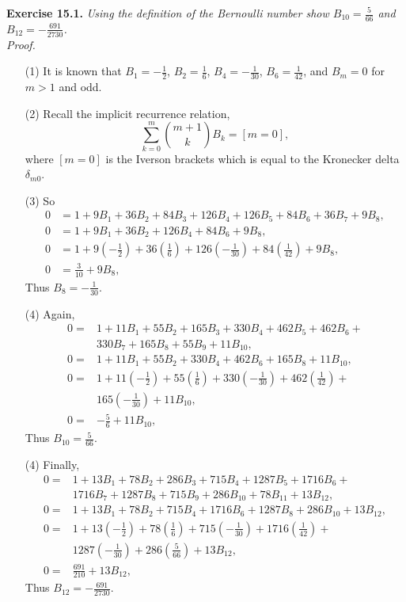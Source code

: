 \documentclass{article}
\begin{document}
\textbf{Exercise 15.1.}
\emph{Using the definition of the Bernoulli number show
$B_{10} = \frac{5}{66}$ and $B_{12} = -\frac{691}{2730}$.} \\

\emph{Proof.}
\begin{enumerate}
\item[(1)]
It is known that
$B_1 = -\frac{1}{2}$,
$B_2 = \frac{1}{6}$,
$B_4 = -\frac{1}{30}$,
$B_6 = \frac{1}{42}$,
and $B_m = 0$ for $m > 1$ and odd.
\item[(2)]
Recall the implicit recurrence relation,
$$\sum_{k = 0}^{m} {m+1 \choose k} B_k = [m = 0],$$
where $[m = 0]$ is the Iverson brackets which is equal to
the Kronecker delta $\delta_{m0}$.
\item[(3)]
So
\begin{align*}
0 &= 1 + 9 B_1 + 36 B_2 + 84 B_3 + 126 B_4 + 126 B_5 + 84 B_6 + 36 B_7 + 9 B_8, \\
0 &= 1 + 9 B_1 + 36 B_2 + 126 B_4 + 84 B_6 + 9 B_8, \\
0 &= 1 + 9 \left( -\frac{1}{2} \right)
+ 36 \left( \frac{1}{6} \right)
+ 126 \left( -\frac{1}{30} \right)
+ 84 \left( \frac{1}{42} \right)
+ 9 B_8, \\
0 &= \frac{3}{10} + 9B_8,
\end{align*}
Thus $B_8 = -\frac{1}{30}$. \\
\item[(4)]
Again,
\begin{align*}
0 =& 1 + 11 B_1 + 55 B_2 + 165 B_3 + 330 B_4 + 462 B_5 + 462 B_6 + \\
   & 330 B_7 + 165 B_8 + 55 B_9 + 11 B_{10}, \\
0 =& 1 + 11 B_1 + 55 B_2 + 330 B_4 + 462 B_6 + 165 B_8 + 11 B_{10}, \\
0 =& 1 + 11 \left( -\frac{1}{2} \right) +
     55 \left( \frac{1}{6} \right) +
     330 \left( -\frac{1}{30} \right) +
     462 \left( \frac{1}{42} \right) + \\
   & 165 \left( -\frac{1}{30} \right) +
     11 B_{10}, \\
0 =& -\frac{5}{6} + 11 B_{10},
\end{align*}
Thus $B_{10} = \frac{5}{66}$. \\
\item[(4)]
Finally,
\begin{align*}
0 =& 1 + 13 B_1 + 78 B_2 + 286 B_3 + 715 B_4 + 1287 B_5 + 1716 B_6 + \\
   & 1716 B_7 + 1287 B_8 + 715 B_9 + 286 B_{10} + 78 B_{11} + 13 B_{12}, \\
0 =& 1 + 13 B_1 + 78 B_2 + 715 B_4 + 1716 B_6 + 1287 B_8 + 286 B_{10} + 13 B_{12}, \\
0 =& 1 + 13 \left( -\frac{1}{2} \right) +
     78 \left( \frac{1}{6} \right) +
     715 \left( -\frac{1}{30} \right) +
     1716 \left( \frac{1}{42} \right) + \\
   & 1287 \left( -\frac{1}{30} \right) +
     286 \left( \frac{5}{66} \right) +
     13 B_{12}, \\
0 =& \frac{691}{210} + 13 B_{12},
\end{align*}
Thus $B_{12} = -\frac{691}{2730}$.
\end{enumerate}
\end{document}
